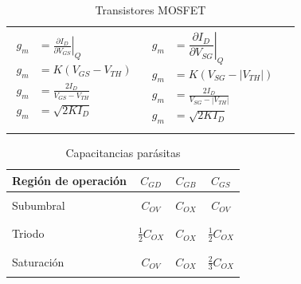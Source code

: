 \documentclass[10pt]{article}
\begin{document}
\begin{table}
\begin{tabular}{|p{4cm}|l|l|}
			{\begin{minipage}{0cm}
			\begin{align*}
				g_m &= \left.\frac{\partial I_D}{\partial V_{GS}}\right\vert_Q \\
				g_m &= K(V_{GS} - V_{TH}) \\
				g_m &= \frac{2I_D}{V_{GS} - V_{TH}} \\
				g_m &= \sqrt{2KI_D}
			\end{align*}
			\end{minipage}}&
			{\begin{minipage}{0cm}
			\begin{align*}
				g_m &= \left.\dfrac{\partial I_D}{\partial V_{SG}}\right\vert_Q \\
				g_m &= K(V_{SG} - |V_{TH}|) \\
				g_m &= \frac{2I_D}{V_{SG} - |V_{TH}|} \\
				g_m &= \sqrt{2KI_D}
			\end{align*}
			\end{minipage}} \\
			&&\\
			\hline
		\end{tabular}
		\caption{Transistores MOSFET}
	\end{table}

	\begin{table}[h]
		\centering
		\begin{tabular}{|l|c|c|c|}
			\hline
			Región de operación & $C_{GD}$ & $C_{GB}$ & $C_{GS}$ \\
			\hline
			&&&\\
			Subumbral & $C_{OV}$ & $C_{OX}$ & $C_{OV}$ \\
			&&&\\
			\hline
			&&&\\
			Triodo & $\frac{1}{2}C_{OX}$ & $C_{OX}$ & $\frac{1}{2}C_{OX}$ \\
			&&&\\
			\hline
			&&&\\
			Saturación & $C_{OV}$ & $C_{OX}$ & $\frac{2}{3}C_{OX}$ \\
			&&&\\
			\hline
		\end{tabular}
		\caption{Capacitancias parásitas}
	\end{table}
\end{document}
